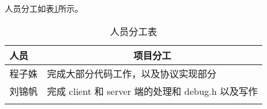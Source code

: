 人员分工如表\ref{tab:fengong}所示。

\begin{longtable}{p{4em} p{14em}}
    \hline
    人员 & \multicolumn{1}{c}{项目分工} \\
    \midrule
        程子姝 & 完成大部分代码工作，以及协议实现部分 \\ \hline        
        刘锦帆 & 完成 client 和 server 端的处理和 debug.h 以及写作 \\ 
        \hline
    
      \caption{人员分工表}  \label{tab:fengong}
\end{longtable}


